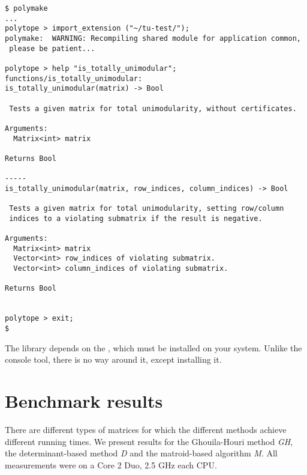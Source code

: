 \documentclass[12pt]{article}
\begin{document}
{\tiny
{}
\begin{lstlisting}
$ polymake 
...
polytope > import_extension ("~/tu-test/");
polymake:  WARNING: Recompiling shared module for application common,
 please be patient...

polytope > help "is_totally_unimodular";
functions/is_totally_unimodular:
is_totally_unimodular(matrix) -> Bool

 Tests a given matrix for total unimodularity, without certificates.

Arguments:
  Matrix<int> matrix 

Returns Bool 

-----
is_totally_unimodular(matrix, row_indices, column_indices) -> Bool

 Tests a given matrix for total unimodularity, setting row/column
 indices to a violating submatrix if the result is negative.

Arguments:
  Matrix<int> matrix 
  Vector<int> row_indices of violating submatrix.
  Vector<int> column_indices of violating submatrix.

Returns Bool 


polytope > exit;
$
\end{lstlisting}}

The library depends on the \cite{Boost}, which must be installed on your system.
Unlike the console tool, there is no way around it, except installing it.

\section{Benchmark results}

There are different types of matrices for which the different methods achieve different running times. We present results for the Ghouila-Houri method {\em GH}, the
determinant-based method {\em D} and the matroid-based algorithm {\em M}. All measurements were on a Core 2 Duo, 2.5 GHz each CPU.


\end{document}
